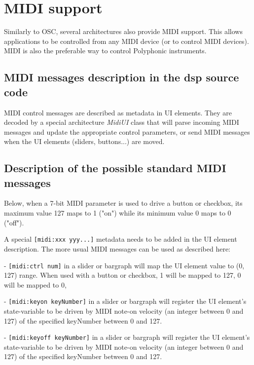 \chapter{MIDI support} \label{sec:midi}

Similarly to OSC, several \faust architectures also provide MIDI support. This allows \faust applications to be controlled from any MIDI device (or to control MIDI devices). MIDI is also the preferable way to control Polyphonic instruments.

\section{MIDI messages description in the dsp source code}

MIDI control messages are described as metadata in UI elements. They are decoded by a special architecture \emph{MidiUI} class that will parse incoming MIDI messages and update the appropriate control parameters, or send MIDI messages when the UI elements (sliders, buttons...) are moved.

\section{Description of the possible standard MIDI messages}

Below, when a 7-bit MIDI parameter is used to drive a button or
checkbox, its maximum value 127 maps to 1 ("on") while its minimum
value 0 maps to 0 ("off").

A special \lstinline'[midi:xxx yyy...]' metadata needs to be added in the UI  element description. The more usual MIDI messages can be used as described here:

- \lstinline'[midi:ctrl num]' in a slider or bargraph will map the UI element value to (0, 127) range. When used with a button or checkbox, 1 will be mapped to 127, 0 will be mapped to 0,

- \lstinline'[midi:keyon keyNumber]' in a slider or bargraph will
register the UI element's state-variable to be driven by MIDI note-on
velocity (an integer between 0 and 127) of the specified keyNumber
between 0 and 127.

- \lstinline'[midi:keyoff keyNumber]' in a slider or bargraph will
register the UI element's state-variable to be driven by MIDI note-on
velocity (an integer between 0 and 127) of the specified keyNumber
between 0 and 127.

